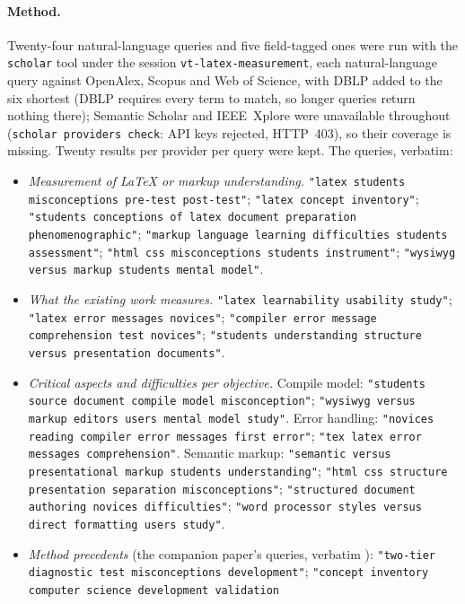 \paragraph{Method.}
Twenty-four natural-language queries and five field-tagged ones were run
with the \texttt{scholar} tool under the session
\texttt{vt-latex-measurement}, each natural-language query against
OpenAlex, Scopus and Web of Science, with DBLP added to the six shortest
(DBLP requires every term to match, so longer queries return nothing
there); Semantic Scholar and IEEE~Xplore were unavailable throughout
(\texttt{scholar providers check}: API keys rejected, HTTP~403), so their
coverage is missing.
Twenty results per provider per query were kept.
The queries, verbatim:
\begin{itemize}
  \item \emph{Measurement of LaTeX or markup understanding.}
    \texttt{"latex students misconceptions pre-test post-test"};
    \texttt{"latex concept inventory"};
    \texttt{"students conceptions of latex document preparation
    phenomenographic"};
    \texttt{"markup language learning difficulties students assessment"};
    \texttt{"html css misconceptions students instrument"};
    \texttt{"wysiwyg versus markup students mental model"}.
  \item \emph{What the existing work measures.}
    \texttt{"latex learnability usability study"};
    \texttt{"latex error messages novices"};
    \texttt{"compiler error message comprehension test novices"};
    \texttt{"students understanding structure versus presentation
    documents"}.
  \item \emph{Critical aspects and difficulties per objective.}
    Compile model:
    \texttt{"students source document compile model misconception"};
    \texttt{"wysiwyg versus markup editors users mental model study"}.
    Error handling:
    \texttt{"novices reading compiler error messages first error"};
    \texttt{"tex latex error messages comprehension"}.
    Semantic markup:
    \texttt{"semantic versus presentational markup students
    understanding"};
    \texttt{"html css structure presentation separation misconceptions"};
    \texttt{"structured document authoring novices difficulties"};
    \texttt{"word processor styles versus direct formatting users study"}.
  \item \emph{Method precedents} (the companion paper's queries,
    verbatim \autocite{VTTerminal}):
    \texttt{"two-tier diagnostic test misconceptions development"};
    \texttt{"concept inventory computer science development validation
}
\end{itemize}
